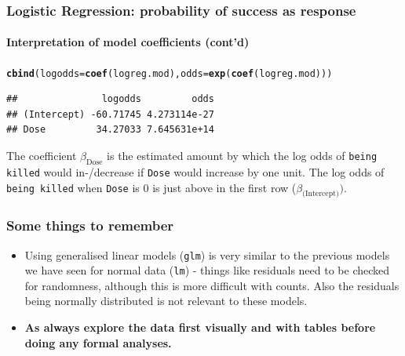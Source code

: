 \documentclass{beamer}\usepackage[]{graphicx}\usepackage[]{color}
\makeatletter
\newcommand{\hlstd}[1]{\textcolor[rgb]{0.345,0.345,0.345}{#1}}%
\newcommand{\hlkwc}[1]{\textcolor[rgb]{0.333,0.667,0.333}{#1}}%
\newcommand{\hlkwd}[1]{\textcolor[rgb]{0.737,0.353,0.396}{\textbf{#1}}}%
\newenvironment{kframe}{%
 \def\at@end@of@kframe{}%
 \ifinner\ifhmode%
  \def\at@end@of@kframe{\end{minipage}}%
  \begin{minipage}{\columnwidth}%
 \fi\fi%
 \def\FrameCommand##1{\hskip\@totalleftmargin \hskip-\fboxsep
 \colorbox{shadecolor}{##1}\hskip-\fboxsep
     \hskip-\linewidth \hskip-\@totalleftmargin \hskip\columnwidth}%
 \MakeFramed {\advance\hsize-\width
   \@totalleftmargin\z@ \linewidth\hsize
   \@setminipage}}%
 {\par\unskip\endMakeFramed%
 \at@end@of@kframe}
\newenvironment{knitrout}{}{} %
\makeatother
\begin{document}
{{{
\begin{frame}[fragile]
\frametitle{Logistic Regression: probability of success as response}
\framesubtitle{Interpretation of model coefficients (cont'd)}
\begin{knitrout}\tiny
{}\color{fgcolor}\begin{kframe}
\begin{alltt}
\hlkwd{cbind}\hlstd{(}\hlkwc{logodds} \hlstd{=} \hlkwd{coef}\hlstd{(logreg.mod),} \hlkwc{odds} \hlstd{=} \hlkwd{exp}\hlstd{(}\hlkwd{coef}\hlstd{(logreg.mod)))}
\end{alltt}
\begin{verbatim}
##               logodds         odds
## (Intercept) -60.71745 4.273114e-27
## Dose         34.27033 7.645631e+14
\end{verbatim}
\end{kframe}
\end{knitrout}
The coefficient $\beta_{\text{Dose}}$ is the estimated amount by which the log
odds of \texttt{being killed} would in-/decrease if \texttt{Dose} would increase
by one unit.
The log odds of \texttt{being killed} when \texttt{Dose} is $0$ is just
above in the first row ($\beta_{\text{(Intercept)}})$.
\end{frame}

\usebackgroundtemplate{}
\begin{frame}
\frametitle{Some things to remember}
\begin{itemize}
\setlength\itemsep{1.5em}
\item Using generalised linear models (\texttt{glm}) is very similar to the
previous models we have seen for normal data (\texttt{lm}) - things like
residuals need to be checked for randomness, although this is more difficult
with counts. Also the residuals being normally distributed is not relevant to these models.
\item \textbf{As always explore the data first visually and with tables before
doing any formal analyses.}
\end{itemize}
\end{frame}

}}}
\end{document}
